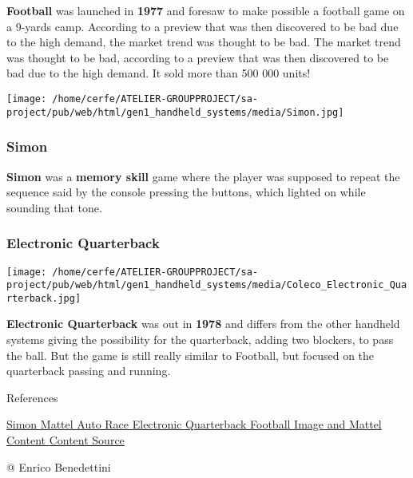 \documentclass[a4paper,10pt]{book}
\begin{document}
 \textbf{Football }  was launched in  \textbf{1977 }  and foresaw to make possible a football game on a
            9-yards camp. According to a preview that was then discovered to be bad due to the high demand, the market trend was thought to be bad.
              The market trend was thought to be bad, according to a preview that was then discovered to be
            bad due to the high demand.  It sold more than 500 000 units!
           
 
 
 
 \texttt{[image: /home/cerfe/ATELIER-GROUPPROJECT/sa-project/pub/web/html/gen1\_handheld\_systems/media/Simon.jpg]}
 \subsubsection{Simon }
 
 \textbf{Simon }  was a  \textbf{memory skill }  game where the player was supposed to repeat the sequence
            said by the console pressing the buttons, which lighted on while sounding that tone.
           
 
 
 
 \subsubsection{Electronic Quarterback }
 \texttt{[image: /home/cerfe/ATELIER-GROUPPROJECT/sa-project/pub/web/html/gen1\_handheld\_systems/media/Coleco\_Electronic\_Quarterback.jpg]}
 
 \textbf{Electronic Quarterback }  was out in  \textbf{1978 }  and differs from the other handheld systems
            giving the possibility for the quarterback, adding two blockers, to pass the ball. But the game is still
            really similar to Football, but focused on the quarterback passing and running.
           
 
 
 
 
 References 
 
 \href{https://en.wikipedia.org/wiki/Simon_(game)}{Simon }
 \href{https://en.wikipedia.org/wiki/Mattel_Auto_Race}{Mattel Auto Race }
 \href{https://en.wikipedia.org/wiki/Electronic_Quarterback}{Electronic Quarterback }
 \href{https://www.handheldmuseum.com/Mattel/FB.htm}{Football Image and Mattel Content }
 \href{https://en.wikipedia.org/wiki/First_generation_of_video_game_consoles#Handheld_systems}{Content Source }
 
 @ Enrico Benedettini 
 
\end{document}
